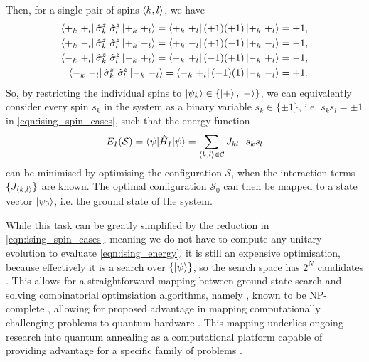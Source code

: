 Then, for a single pair of spins ${ \langle k, l \rangle }$, we have
\begin{equation}
    \label{eqn:ising_spin_cases}
    \begin{split}
        \bra{+_{k} \ +_{l} } \hat{\sigma}^{z}_{k} \ \hat{\sigma}^z_{l}  \ket{+_{k} \ +_{l} } =  \bra{+_{k} \ +_{l} } (+1)(+1) \ket{+_{k} \ +_{l} } = +1, \\
        \bra{+_{k} \ -_{l} } \hat{\sigma}^{z}_{k} \ \hat{\sigma}^z_{l} \ket{+_{k} \ -_{l} } = \bra{+_{k} \ -_{l} } (+1)(-1) \ket{+_{k} \ -_{l} } = -1 , \\
        \bra{-_{k} \ +_{l} } \hat{\sigma}^{z}_{k} \ \hat{\sigma}^z_{l} \ket{-_{k} \ +_{l} } = \bra{-_{k} \ +_{l} } (-1)(+1) \ket{-_{k} \ +_{l} } = -1, \\
        \bra{-_{k} \ -_{l} } \hat{\sigma}^{z}_{k} \ \hat{\sigma}^z_{l} \ket{-_{k} \ -_{l} } = \bra{-_{k} \ +_{l} } (-1)(1) \ket{-_{k} \ -_{l} } = +1. \\
    \end{split}
\end{equation}
So, by restricting the individual spins to $\ket{\psi_k} \in \{\ket{+}, \ket{-}\}$, 
    we can equivalently consider every spin $s_k$ in the system
    as a binary variable $s_k \in \{\pm 1\}$,
    i.e. $s_k s_l = \pm 1$ in \cref{eqn:ising_spin_cases},
    such that the energy function
\begin{equation}
    \label{eqn:ising_energy}
    E_I(\mathcal{S}) = \braket{ \psi | \hat{H}_I | \psi } = \sum\limits_{{ \langle k, l \rangle } \in { \mathcal{C}}} J_{kl} \ \ s_k s_l
\end{equation}
    can be minimised by optimising the configuration $\mathcal{S}$, when the interaction terms $\{J_{{ \langle k, l \rangle }}\}$ are known.
The optimal configuration $\mathcal{S}_0$ can then be mapped to a 
    state vector $\ket{\psi_0}$, i.e. the ground state of the system. 
\par 

While this task can be greatly simplified by the reduction in \cref{eqn:ising_spin_cases}, 
    meaning we do not have to compute any unitary evolution to evaluate \cref{eqn:ising_energy},
    it is still an expensive optimisation, because effectively it is a search over $\{ \ket{\psi }\}$, 
    so the search space has $2^N$ candidates \cite{onsager1944crystal, barahona1982computational}. 
This allows for a straightforward mapping between ground state search 
    and solving combinatorial optimsiation algorithms, namely , 
    known to be NP-complete \cite{garey1979computers}, 
    allowing for proposed advantage in mapping computationally challenging problems to quantum hardware \cite{lucas2014ising}. 
This mapping underlies ongoing research into quantum annealing as a computational platform capable of providing 
    advantage for a specific family of problems \cite{santoro2006optimization, bapst2013quantum, johnson2011quantum}. 
\par

